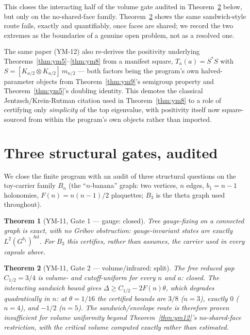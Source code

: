 \documentclass[aps,prd,twocolumn,superscriptaddress,nofootinbib]{revtex4-2}
\newtheorem{theorem}{Theorem}
\begin{document}
This closes the interacting half of the volume gate audited in
Theorem~\ref{thm:ym11} below, but only on the no-shared-face family.
Theorem~\ref{thm:ym11} shows the same sandwich-style route fails, exactly
and quantifiably, once faces are shared; we record the two extremes as
the boundaries of a genuine open problem, not as a resolved one.

The same paper (YM-12) also re-derives the positivity underlying
Theorems~\ref{thm:ym5}--\ref{thm:ym8} from a manifest square,
$T_\kappa(a)=S^*S$ with $S=[K_{a/2}\otimes K_{a/2}]\,m_{\kappa/2}$ ---
both factors being the program's own halved-parameter objects from
Theorem~\ref{thm:ym9}'s semigroup property and Theorem~\ref{thm:ym5}'s
doubling identity. This demotes the classical Jentzsch/Krein-Rutman
citation used in Theorem~\ref{thm:ym8} to a role of certifying only
\emph{simplicity} of the top eigenvalue, with positivity itself now
square-sourced from within the program's own objects rather than
imported.

\section{Three structural gates, audited}\label{sec:gates}

We close the finite program with an audit of three structural questions
on the toy-carrier family $B_n$ (the ``$n$-banana'' graph: two vertices,
$n$ edges, $b_1=n-1$ holonomies, $F(n)=n(n-1)/2$ plaquettes; $B_3$ is the
theta graph used throughout).

\begin{theorem}[YM-11, Gate 1 --- gauge: closed]\label{thm:ym11a}
Tree gauge-fixing on a connected graph is exact, with no Gribov
obstruction: gauge-invariant states are exactly
$L^2(G^{b_1})^{\mathrm{Ad}}$. For $B_3$ this certifies, rather than
assumes, the carrier used in every capsule above.
\end{theorem}

\begin{theorem}[YM-11, Gate 2 --- volume/infrared: split]\label{thm:ym11}
The free reduced gap $C_{1/2}=3/4$ is volume- and cutoff-uniform for
every $n$ and $a$: closed. The interacting sandwich bound gives
$\Delta\ge C_{1/2}-2F(n)\theta$, which degrades \emph{quadratically} in
$n$: at $\theta=1/16$ the certified bounds are $3/8$ ($n{=}3$), exactly
$0$ ($n{=}4$), and $-1/2$ ($n{=}5$). The sandwich/envelope route is
therefore proven \emph{insufficient} for volume uniformity beyond
Theorem~\ref{thm:ym12}'s no-shared-face restriction, with the critical
volume computed exactly rather than estimated.
\end{theorem}
\end{document}
